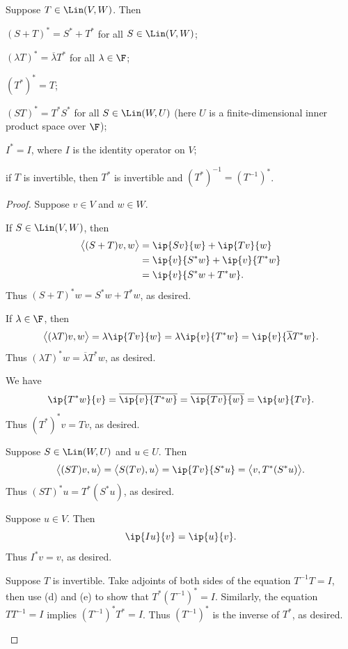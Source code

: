 \begin{result}\label{ax:7.5}
Suppose $T\in\Lin(V,W)$. Then
\begin{parts}
\item $(S+T)^*=S^*+T^*$ for all $S\in\Lin(V,W)$;
\item $(\lambda T)^*=\overline{\lambda}T^*$ for all $\lambda\in\F$;
\item $(T^*)^*=T$;
\item $(ST)^*=T^*S^*$ for all $S\in\Lin(W,U)$ (here $U$ is a finite-dimensional
  inner product space over $\F$);
\item $I^*=I$, where $I$ is the identity operator on $V$;
\item if $T$ is invertible, then $T^*$ is invertible and
  $(T^*)^{-1}=(T^{-1})^*$.
\end{parts}
\end{result}

\begin{proof}
Suppose $v\in V$ and $w\in W$.
\begin{parts}
\item If $S\in\Lin(V,W)$, then
  \begin{align*}
  \bigl\langle (S+T)v,w\bigr\rangle &= \ip{Sv}{w}+\ip{Tv}{w}\\
    &= \ip{v}{S^*w}+\ip{v}{T^*w}\\
    &= \ip{v}{S^*w+T^*w}.
  \end{align*}
  Thus $(S+T)^*w=S^*w+T^*w$, as desired.
\item If $\lambda\in\F$, then
  \[ \bigl\langle (\lambda T)v,w\bigr\rangle = \lambda\ip{Tv}{w}
     = \lambda\ip{v}{T^*w} = \ip{v}{\overline{\lambda}T^*w}. \]
  Thus $(\lambda T)^*w=\overline{\lambda}T^*w$, as desired.
\item We have
  \[ \ip{T^*w}{v} = \overline{\ip{v}{T^*w}} = \overline{\ip{Tv}{w}}
     = \ip{w}{Tv}. \]
  Thus $(T^*)^*v=Tv$, as desired.
\item Suppose $S\in\Lin(W,U)$ and $u\in U$. Then
  \[ \bigl\langle (ST)v,u\bigr\rangle = \bigl\langle S(Tv),u\bigr\rangle
     = \ip{Tv}{S^*u} = \bigl\langle v,T^*(S^*u)\bigr\rangle. \]
  Thus $(ST)^*u=T^*(S^*u)$, as desired.
\item Suppose $u\in V$. Then
  \[ \ip{Iu}{v} = \ip{u}{v}. \]
  Thus $I^*v=v$, as desired.
\item Suppose $T$ is invertible. Take adjoints of both sides of the equation
  $T^{-1}T=I$, then use (d) and (e) to show that $T^*(T^{-1})^*=I$. Similarly,
  the equation $TT^{-1}=I$ implies $(T^{-1})^*T^*=I$. Thus $(T^{-1})^*$ is the
  inverse of $T^*$, as desired. \qedhere
\end{parts}
\end{proof}

